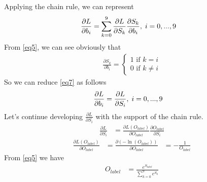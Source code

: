 \documentclass[a4paper,12pt]{article}
\begin{document}
Applying the chain rule, we can represent
\begin{equation}
\begin{aligned}
\frac{\partial{L}}{\partial{b_i}} &= \sum_{k=0}^9\frac{\partial{L}}{\partial{S_k}}\frac{\partial{S_k}}{\partial{b_i}},\thickspace i = 0, ..., 9 \label{eq7}
\end{aligned}
\end{equation}
From \eqref{eq5}, we can see obviously that
\begin{equation}
\begin{aligned}
\frac{\partial{S_k}}{\partial{b_i}} = \left\{
                                        \begin{array}{ll}
                                          1 \text{ if } k = i\\
                                          0 \text{ if } k \neq i
                                        \end{array}
                                      \right. \label{eq8}
\end{aligned}
\end{equation}
So we can reduce \eqref{eq7} as follows
\begin{equation}
\begin{aligned}
\frac{\partial{L}}{\partial{b_i}} &= \frac{\partial{L}}{\partial{S_i}},\thickspace i = 0, ..., 9 \label{eq9}
\end{aligned}
\end{equation}
Let's continue developing $\frac{\partial{L}}{\partial{S_i}}$ with the support of the chain rule.
\begin{equation}
\begin{aligned}
\frac{\partial{L}}{\partial{S_i}} &= \frac{\partial{L(O_{label})}}{\partial{O_{label}}}\frac{\partial{O_{label}}}{\partial{S_i}} \label{eq10}
\end{aligned}
\end{equation}
\begin{equation}
\begin{aligned}
\frac{\partial{L(O_{label})}}{\partial{O_{label}}} &= \frac{\partial{(-\ln(O_{label}))}}{\partial{O_{label}}}
                                                   &= -\frac{1}{O_{label}} \label{eq11}
\end{aligned}
\end{equation}
From \eqref{eq5} we have
\begin{equation}
\begin{aligned}
O_{label} &= \frac{e^{S_{label}}}{\sum\limits_{k=0}^{9}e^{S_{k}}} \label{eq12}
\end{aligned}
\end{equation}
\end{document}
